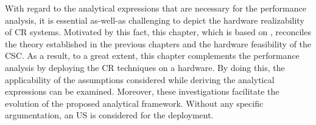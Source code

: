 With regard to the analytical expressions that are necessary for the performance analysis, it is essential as-well-as challenging to depict the hardware realizability of CR systems. Motivated by this fact, this chapter, which is based on , reconciles the theory established in the previous chapters and the hardware feasibility of the CSC. As a result, to a great extent, this chapter complements the performance analysis by deploying the CR techniques on a hardware. By doing this, the applicability of the assumptions considered while deriving the analytical expressions can be examined. Moreover, these investigations facilitate the evolution of the proposed analytical framework. Without any specific argumentation, an US is considered for the deployment.    





